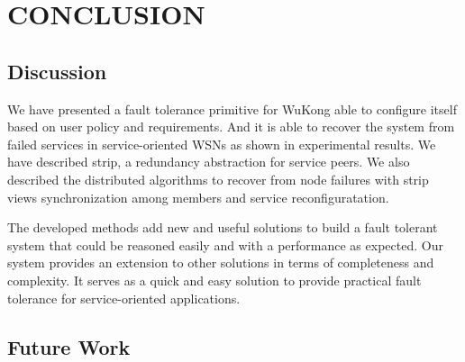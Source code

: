 \cleardoublepage
\singlespacing
\chapter{CONCLUSION}
\label{c:conclusion}
\doublespacing\nointerlineskip


\section{Discussion}

We have presented a fault tolerance primitive for WuKong able to configure itself
based on user policy and requirements. And it is able to recover the system from failed
services in service-oriented WSNs as shown in experimental results. We
have described strip, a redundancy abstraction for service peers. We also
described the distributed algorithms to recover from node failures with strip
views synchronization among members and service reconfiguratation.

The developed methods add new and useful solutions to build a fault tolerant
system that could be reasoned easily and with a performance as expected. Our
system provides an extension to other solutions in terms of completeness and
complexity. It serves as a quick and easy solution to provide practical fault
tolerance for service-oriented applications.



\section{Future Work}



